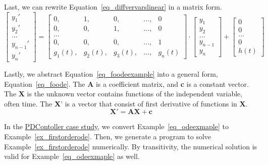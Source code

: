 Last, we can rewrite Equation~\ref{eq_diffvervarslinear} in a matrix form.
\begin{equation} \label{eq_foodeexample}
	\begin{bmatrix}
		y_{1}' \\
    y_{2}' \\
    \dots  \\
    y_{n-1}' \\
    y_{n}'
	\end{bmatrix}
    = 
  \begin{bmatrix}
		0, & 1, & 0, & \dots, & 0 \\
    0, & 0, & 1, & \dots, & 0 \\
    \dots \\
    0, & 0, & 0, & \dots, & 1 \\
    g_{1}(t), & g_{2}(t), & g_{3}(t), & \dots, & g_{n}(t)
	\end{bmatrix}
    \cdot
  \begin{bmatrix}
		y_{1} \\
    y_{2} \\
    \dots  \\
    y_{n-1} \\
    y_{n}
	\end{bmatrix}
    + 
  \begin{bmatrix}
    0 \\
    0 \\
    \dots  \\
    0 \\
    h(t)
	\end{bmatrix}
\end{equation}

Lastly, we abstract Equation~\ref{eq_foodeexample} into a general form, Equation~\ref{eq_foode}. The \textbf{A} is a coefficient matrix, and \textbf{c} is a constant vector. The \textbf{X} is the unknown vector contains functions of the independent variable, often time. The \textbf{X}' is a vector that consist of first derivative of functions in \textbf{X}.
\begin{equation} \label{eq_foode}
    \boldsymbol{X}' = \boldsymbol{AX} + \boldsymbol{c}
\end{equation}

In the \href{https://jacquescarette.github.io/Drasil/examples/pdcontroller/SRS/srs/PDController_SRS.html#Sec:IMs}{PDContoller case study}, we convert Example~\ref{eq_odeexmaple} to Example~\ref{ex_firstorderode}. Then, we generate a program to solve Example~\ref{ex_firstorderode} numerically. By transitivity, the numerical solution is valid for Example~\ref{eq_odeexmaple} as well.

